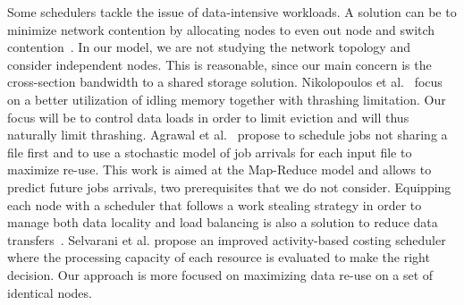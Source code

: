 \documentclass[conference,10pt]{IEEEtran}
\begin{document}
Some schedulers tackle the issue of data-intensive workloads. 
A solution can be to minimize network contention by allocating nodes to even out node and
switch contention~\cite{minimize_network_contention}. 
In our model, we are not studying the network topology and consider independent nodes.
This is reasonable, since our main concern is the cross-section bandwidth to a shared storage solution.
%
Nikolopoulos et al.~\cite{Nikolopoulos2003AdaptiveSU}
focus on a better utilization of idling memory together with 
thrashing limitation.
Our focus will be to control data loads in order to limit eviction
and will thus naturally limit thrashing. 
%
Agrawal et al.~\cite{Scheduling_Shared_Scans_of_Large_Data_Files}
propose to schedule jobs not sharing a file first
and to use a stochastic model of job arrivals for each input file to maximize re-use.
This work is aimed at the Map-Reduce model and allows to predict future jobs arrivals, two prerequisites that we do not consider. 
%
Equipping each node with a scheduler that follows a work
stealing strategy in order to manage both data locality 
and load balancing is also a solution to reduce data transfers~\cite{Optimizing_load_balancing_and_data_locality_with_data_aware_scheduling}. 
%
Selvarani et al. propose an improved activity-based costing scheduler~\cite{Improved_cost_based_algorithm}
where the processing capacity of each resource is evaluated to make the right decision.
Our approach is more focused on maximizing data re-use on a 
set of identical nodes.
\end{document}
